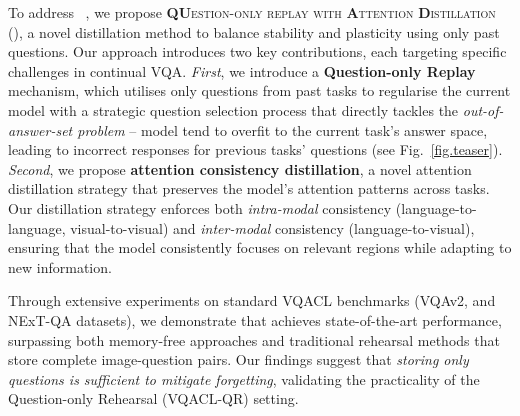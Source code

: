 To address \setting~, we propose \textsc{\textbf{QU}estion-only replay with \textbf{A}ttention \textbf{D}istillation} (\textbf{\qstmethodshort{}}), a novel distillation method to balance stability and plasticity using only past questions. Our approach introduces two key contributions, each targeting specific challenges in continual VQA. \textit{First}, we introduce a \textbf{Question-only Replay} mechanism, which utilises only questions from past tasks to regularise the current model with a strategic question selection process that directly tackles the \textit{out-of-answer-set problem} -- model tend to overfit to the current task's answer space, leading to incorrect responses for previous tasks' questions (see Fig.~\ref{fig.teaser}). \textit{Second}, we propose \textbf{attention consistency distillation}, a novel attention distillation strategy that preserves the model's attention patterns across tasks. Our distillation strategy enforces both \textit{intra-modal} consistency (language-to-language, visual-to-visual) and \textit{inter-modal} consistency (language-to-visual), ensuring that the model consistently focuses on relevant regions while adapting to new information.

Through extensive experiments on standard VQACL benchmarks (VQAv2, and NExT-QA datasets), we demonstrate that \qstmethodshort{} achieves state-of-the-art performance, surpassing both memory-free approaches and traditional rehearsal methods that store complete image-question pairs. Our findings suggest that \textit{storing only questions is sufficient to mitigate forgetting}, validating the practicality of the Question-only Rehearsal (VQACL-QR) setting.